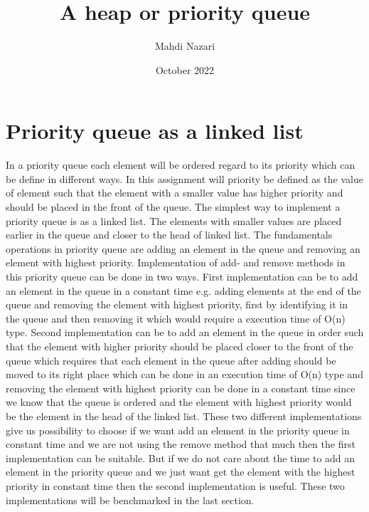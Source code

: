 \documentclass[a4paper,11pt]{article}
\begin{document}
\title{
    \textbf{A heap or priority queue}
}
\author{Mahdi Nazari}
\date{October 2022}

\maketitle
\section*{Priority queue as a linked list}
In a priority queue each element will be ordered regard to its priority which can be define in different ways. In this assignment will priority be defined as the value of element such that the element with a smaller value has higher priority and should be placed in the front of the queue. The simplest way to implement a priority queue is as a linked list. The elements with smaller values are placed earlier in the queue and closer to the head of linked list. The fundamentals operations in priority queue are adding an element in the queue and removing an element with highest priority. Implementation of add- and remove methods in this priority queue can be done in two ways. First implementation can be to add an element in the queue in a constant time e.g. adding elements at the end of the queue and removing the element with highest priority, first by identifying it in the queue and then removing it which would require a execution time of O(n) type. Second implementation can be to add an element in the queue in order such that the element with higher priority should be placed closer to the front of the queue which requires that each element in the queue after adding should be moved to its right place which can be done in an execution time of O(n) type and removing the element with highest priority can be done in a constant time since we know that the queue is ordered and the element with highest priority would be the element in the head of the linked list.\newline
These two different implementations give us possibility to choose if we want add an element in the priority queue in constant time and we are not using the remove method that much then the first implementation can be suitable. But if we do not care about the time to add an element in the priority queue and we just want get the element with the highest priority in constant time then the second implementation is useful. These two implementations will be benchmarked in the last section.     
\end{document}
